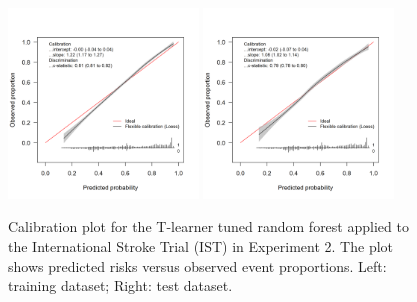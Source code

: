 \begin{figure}[htbp]
\centering
\includegraphics[width=0.45\textwidth]{img/results_IST/IST_tuned_rf_tlearner_train_calibration_plot.png}
\includegraphics[width=0.45\textwidth]{img/results_IST/IST_tuned_rf_tlearner_test_calibration_plot.png}
\caption{Calibration plot for the T-learner tuned random forest applied to the International Stroke Trial (IST) in Experiment 2. The plot shows predicted risks versus observed event proportions. Left: training dataset; Right: test dataset.}
\label{fig:calibration_IST_tuned_rf}
\end{figure}


